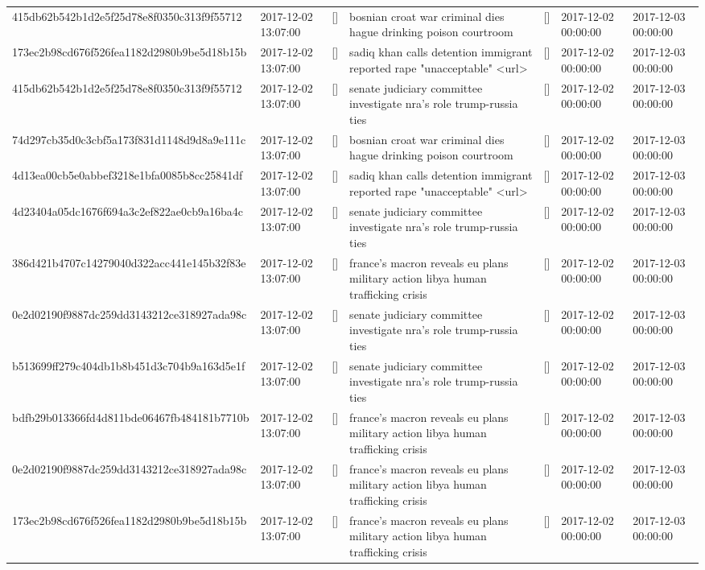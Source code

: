 \begin{tabular}{lllllll}
415db62b542b1d2e5f25d78e8f0350c313f9f55712 & 2017-12-02 13:07:00 & [] & bosnian croat war criminal dies hague drinking poison courtroom & [] & 2017-12-02 00:00:00 & 2017-12-03 00:00:00 \\
173ec2b98cd676f526fea1182d2980b9be5d18b15b & 2017-12-02 13:07:00 & [] & sadiq khan calls detention immigrant reported rape "unacceptable" <url> & [] & 2017-12-02 00:00:00 & 2017-12-03 00:00:00 \\
415db62b542b1d2e5f25d78e8f0350c313f9f55712 & 2017-12-02 13:07:00 & [] & senate judiciary committee investigate nra's role trump-russia ties & [] & 2017-12-02 00:00:00 & 2017-12-03 00:00:00 \\
74d297cb35d0c3cbf5a173f831d1148d9d8a9e111c & 2017-12-02 13:07:00 & [] & bosnian croat war criminal dies hague drinking poison courtroom & [] & 2017-12-02 00:00:00 & 2017-12-03 00:00:00 \\
4d13ea00cb5e0abbef3218e1bfa0085b8cc25841df & 2017-12-02 13:07:00 & [] & sadiq khan calls detention immigrant reported rape "unacceptable" <url> & [] & 2017-12-02 00:00:00 & 2017-12-03 00:00:00 \\
4d23404a05dc1676f694a3c2ef822ae0cb9a16ba4c & 2017-12-02 13:07:00 & [] & senate judiciary committee investigate nra's role trump-russia ties & [] & 2017-12-02 00:00:00 & 2017-12-03 00:00:00 \\
386d421b4707c14279040d322acc441e145b32f83e & 2017-12-02 13:07:00 & [] & france's macron reveals eu plans military action libya human trafficking crisis & [] & 2017-12-02 00:00:00 & 2017-12-03 00:00:00 \\
0e2d02190f9887dc259dd3143212ce318927ada98c & 2017-12-02 13:07:00 & [] & senate judiciary committee investigate nra's role trump-russia ties & [] & 2017-12-02 00:00:00 & 2017-12-03 00:00:00 \\
b513699ff279c404db1b8b451d3c704b9a163d5e1f & 2017-12-02 13:07:00 & [] & senate judiciary committee investigate nra's role trump-russia ties & [] & 2017-12-02 00:00:00 & 2017-12-03 00:00:00 \\
bdfb29b013366fd4d811bde06467fb484181b7710b & 2017-12-02 13:07:00 & [] & france's macron reveals eu plans military action libya human trafficking crisis & [] & 2017-12-02 00:00:00 & 2017-12-03 00:00:00 \\
0e2d02190f9887dc259dd3143212ce318927ada98c & 2017-12-02 13:07:00 & [] & france's macron reveals eu plans military action libya human trafficking crisis & [] & 2017-12-02 00:00:00 & 2017-12-03 00:00:00 \\
173ec2b98cd676f526fea1182d2980b9be5d18b15b & 2017-12-02 13:07:00 & [] & france's macron reveals eu plans military action libya human trafficking crisis & [] & 2017-12-02 00:00:00 & 2017-12-03 00:00:00 \\

\end{tabular}
